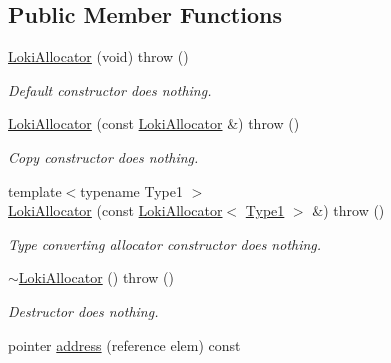 \subsection*{Public Member Functions}
\begin{DoxyCompactItemize}
\item 
\hypertarget{classLoki_1_1LokiAllocator_aca0350e215466300ad6e6998f272aba5}{}\hyperlink{classLoki_1_1LokiAllocator_aca0350e215466300ad6e6998f272aba5}{Loki\+Allocator} (void)  throw ()\label{classLoki_1_1LokiAllocator_aca0350e215466300ad6e6998f272aba5}

\begin{DoxyCompactList}\small\item\em Default constructor does nothing. \end{DoxyCompactList}\item 
\hypertarget{classLoki_1_1LokiAllocator_a69aaba440cb8ee0527a04691c9e3b9eb}{}\hyperlink{classLoki_1_1LokiAllocator_a69aaba440cb8ee0527a04691c9e3b9eb}{Loki\+Allocator} (const \hyperlink{classLoki_1_1LokiAllocator}{Loki\+Allocator} \&)  throw ()\label{classLoki_1_1LokiAllocator_a69aaba440cb8ee0527a04691c9e3b9eb}

\begin{DoxyCompactList}\small\item\em Copy constructor does nothing. \end{DoxyCompactList}\item 
\hypertarget{classLoki_1_1LokiAllocator_aa2f4469767a21a7f393075f9ea16730a}{}{\footnotesize template$<$typename Type1 $>$ }\\\hyperlink{classLoki_1_1LokiAllocator_aa2f4469767a21a7f393075f9ea16730a}{Loki\+Allocator} (const \hyperlink{classLoki_1_1LokiAllocator}{Loki\+Allocator}$<$ \hyperlink{classType1}{Type1} $>$ \&)  throw ()\label{classLoki_1_1LokiAllocator_aa2f4469767a21a7f393075f9ea16730a}

\begin{DoxyCompactList}\small\item\em Type converting allocator constructor does nothing. \end{DoxyCompactList}\item 
\hypertarget{classLoki_1_1LokiAllocator_a9ac9082a843ef7c772a74a420d5ffd88}{}\hyperlink{classLoki_1_1LokiAllocator_a9ac9082a843ef7c772a74a420d5ffd88}{$\sim$\+Loki\+Allocator} ()  throw ()\label{classLoki_1_1LokiAllocator_a9ac9082a843ef7c772a74a420d5ffd88}

\begin{DoxyCompactList}\small\item\em Destructor does nothing. \end{DoxyCompactList}\item 
\hypertarget{classLoki_1_1LokiAllocator_ac95609b0bb01996e9d7fa94406f787b4}{}pointer \hyperlink{classLoki_1_1LokiAllocator_ac95609b0bb01996e9d7fa94406f787b4}{address} (reference elem) const \label{classLoki_1_1LokiAllocator_ac95609b0bb01996e9d7fa94406f787b4}


\end{DoxyCompactItemize}
